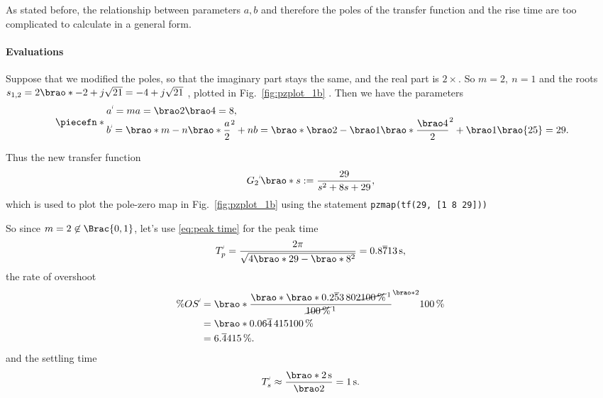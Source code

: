 \documentclass[12pt]{article}
\newcommand*\siexpr[2][]{\SI[parse-numbers=false,#1]{#2}}%
\DeclarePairedDelimiter\brao()%
\DeclarePairedDelimiter\Brac\{\}%
\DeclarePairedDelimiter\piecefn\{.
\newcommand{\setprime}[2][1]{%
    {#2}^{%
        \raisebox{1pt}{%
            \scalebox{0.5}{%
                \itshape\sffamily\uppercase%
                \expandafter{%
                    \romannumeral#1%
                }%
            }%
        }
    }%
}%
\begin{document}
\begin{enumerate}[(a)]
        As stated before, the relationship between parameters $a, b$ and therefore the poles of the transfer function and the rise time are too complicated to calculate in a general form.

        \paragraph{Evaluations}

        Suppose that we modified the poles, so that the imaginary part stays the same, and the real part is $2\times$.
        So $m = 2,\ n = 1$
        and the roots $s_{1,2} = 2\brao*{-2} + j\sqrt{21} = -4 + j\sqrt{21}$%
        , plotted in Fig.~\ref{fig:pzplot_1b}%
        .
        Then we have the parameters
        \begin{equation}
            \piecefn*{
                \begin{array}{@{}l@{}}\displaystyle
                    \setprime{a} = ma = \brao2\brao4 = 8,
                \\*\displaystyle
                      \setprime{b}
                    = \brao*{m - n}\brao*{\frac{a}2}^2 + nb
                    = \brao*{\brao2 - \brao1}\brao*{\frac{\brao4}2}^2 + \brao1\brao{25}
                    = 29\rlap.
                \end{array}
            }
        \end{equation}

        Thus the new transfer function
        \begin{equation}
            \setprime{G_2}\brao*s := \frac{29}{s^2 + 8s + 29},
        \end{equation}
        which is used to plot the pole-zero map in Fig.~\ref{fig:pzplot_1b} using the statement \texttt{pzmap(tf(29, [1 8 29]))}

        So since $m = 2 \not\in\Brac{0, 1}$, let's use \eqref{eq:peak time} for the peak time
        \begin{equation}
            \setprime{T}_p = \frac{2\pi}{\sqrt{4\brao*{29} - \brao*{8}^2}}
                = \siexpr{0.8\overline713}\second,
        \end{equation}
        the rate of overshoot
        \begin{equation}
            \begin{aligned}
                  \%\setprime{OS}
                &{}= \brao*{\frac{\brao*{\brao*{0.2\overline53\,802}\cancel{{\SI{100}\percent}}^{\,1}}}{\cancel{\SI{100}\percent}^{\,1}}}^{\brao*{2}} \SI{100}\percent
            \\*
                &{}= \brao*{0.06\overline4\,415} \SI{100}\percent
            \\*
                &{}= \siexpr{6.\overline4415}\percent.
            \\*
            \end{aligned}
        \end{equation}
        and the settling time
        \begin{equation}
            \setprime{T}_s
            \approx \frac{\brao*{\SI2\second}}{\brao2}
            = \SI1\second.
        \end{equation}


\end{enumerate}
\end{document}

